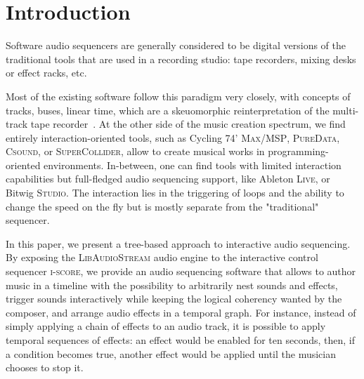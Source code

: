 \documentclass{article}
\title{\papertitle}
\newcommand*{\LibAudioStream}{\textsc{LibAudioStream}\xspace}
\newcommand*{\iscore}{\textsc{i-score}\xspace}
\newcommand*{\maxmsp}{Cycling 74' \textsc{Max/MSP}\xspace}
\newcommand*{\puredata}{\textsc{PureData}\xspace}
\newcommand*{\csound}{\textsc{Csound}\xspace}
\newcommand*{\supercollider}{\textsc{SuperCollider}\xspace}
\newcommand*{\abletonlive}{Ableton \textsc{Live}\xspace}
\newcommand*{\bitwigstudio}{Bitwig \textsc{Studio}\xspace}
\begin{document}
\capstartfalse
\maketitle
\capstarttrue

\begin{abstract}
The field of digital music authoring provides a wealth of creative environments in which music can be created and authored: patchers, programming languages, and multitrack sequencers.
By combining the \iscore interactive sequencer to the \LibAudioStream audio engine, a new music software able to represent and play rich interactive audio sequences is introduced.
We present new stream expressions compatible with the \LibAudioStream, and 
use them to create an interactive audio graph: hierarchical stream and send - return streams.
This allows to create branching and arbitrarily nested musical scores, in an OSC-centric environment.
Three examples of interactive musical scores are presented: the recreation of a traditional multi-track sequencer, an interactive musical score, and a temporal effect graph.
\end{abstract}

\section{Introduction}
Software audio sequencers are generally considered to be digital versions 
of the traditional tools that are used in a recording studio: tape recorders, 
mixing desks or effect racks, etc.

Most of the existing software follow this paradigm very closely, with 
concepts of tracks, buses, linear time, which are a skeuomorphic reinterpretation of the multi-track tape recorder~\cite{bell2015skeuomorphism}.
At the other side of the music creation spectrum, we find entirely interaction-oriented tools, 
such as \maxmsp, \puredata, \csound, or \supercollider, allow to create musical works in programming-oriented 
environments.
In-between, one can find tools with limited interaction capabilities but full-fledged audio sequencing support, 
like \abletonlive, or \bitwigstudio.
The interaction lies in the triggering of loops and the ability to change the speed on the fly but is mostly separate from the "traditional" sequencer.

In this paper, we present a tree-based approach to interactive audio sequencing.
By exposing the \LibAudioStream audio engine to the interactive control sequencer \iscore, 
we provide an audio sequencing software that allows to author music in a timeline 
with the possibility to arbitrarily nest sounds and effects, trigger sounds interactively 
while keeping the logical coherency wanted by the composer, and arrange audio effects in a temporal graph.
For instance, instead of simply applying a chain of effects to an audio track, it is possible to apply temporal sequences of effects: an effect would be enabled for ten seconds, then, if a condition becomes true, another effect would be applied until the musician chooses to stop it.
\end{document}
